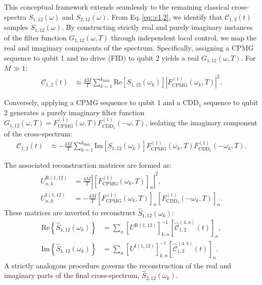 \documentclass[%
 reprint,
superscriptaddress,
 amsmath,amssymb,
 aps,
pra,
floatfix,
]{revtex4-2}
\begin{document}
This conceptual framework extends seamlessly to the remaining classical cross-spectra $S_{1,12}(\omega)$ and $S_{2,12}(\omega)$. From Eq.\,\eqref{eq::c1,2}, we identify that $\mathcal{C}_{1,2}(t)$ samples $S_{1,12}(\omega)$. By constructing strictly real and purely imaginary instances of the filter function $G_{1,12}(\omega,T)$ through independent local control, we map the real and imaginary components of the spectrum. Specifically, assigning a CPMG sequence to qubit 1 and no drive (FID) to qubit 2 yields a real $G_{1,12}(\omega,T)$. For $M\gg1$:
\begin{align}
    \mathcal{C}_{1,2}(t)&\approx\frac{4M}{T}\sum_{k=1}^{k_{\max}}\text{Re}\left[S_{1,12}(\omega_k)\right]\left|F^{(1)}_{\text{CPMG}}(\omega_k,T)\right|^2.
\end{align}
\begin{widetext}
Conversely, applying a CPMG sequence to qubit 1 and a $\text{CDD}_1$ sequence to qubit 2 generates a purely imaginary filter function $G_{1,12}(\omega, T)=F^{(1)}_{\text{CPMG}}(\omega, T)F^{(1)}_{\text{CDD}_1}(-\omega, T)$, isolating the imaginary component of the cross-spectrum:
\begin{align}
    \mathcal{C}_{1,2}(t)&\approx-\frac{4 M}{T}\sum_{k=1}^{k_{\max}}\text{Im}\left[S_{1,12}(\omega_k)\right]F^{(1)}_{\text{CPMG}}(\omega_k, T)F^{(1)}_{\text{CDD}_1}(-\omega_k, T).
\end{align}
\end{widetext}
The associated reconstruction matrices are formed as:
\begin{align}
    U^{\text{R}(1,12)}_{n,k}&=\frac{4M}{T}\left|\left[F^{(1)}_{\text{CPMG}}(\omega_k,T)\right]_n\right|^2,\\
    U^{\text{I}(1,12)}_{n,k}&=-\frac{4M}{T}\left[F^{(1)}_{\text{CPMG}}(\omega_k, T)\right]_n\left[F^{(1)}_{\text{CDD}_1}(-\omega_k, T)\right]_n.
\end{align}
These matrices are inverted to reconstruct $\hat{S}_{1,12}(\omega_k)$:
\begin{align}
    \text{Re}\left\{\hat{S}_{1,12}(\omega_k)\right\}&=\sum_n\left[U^{\text{R}(1,12)}\right]^{-1}_{k,n}\left[\hat{\mathcal{C}}_{1,2}^{(4.\,a)}(t)\right]_n,\\
    \text{Im}\left\{\hat{S}_{1,12}(\omega_k)\right\}&=\sum_n\left[U^{\text{I}(1,12)}\right]^{-1}_{k,n}\left[\hat{\mathcal{C}}_{1,2}^{(4.\,b)}(t)\right]_n.
\end{align}
A strictly analogous procedure governs the reconstruction of the real and imaginary parts of the final cross-spectrum, $\hat{S}_{2,12}(\omega_k)$.
\end{document}
